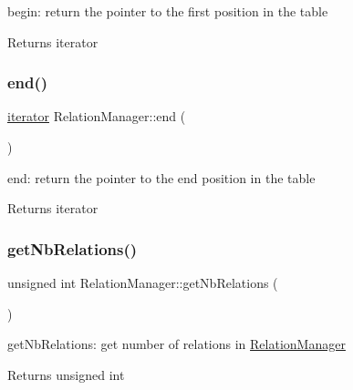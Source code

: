 begin\+: return the pointer to the first position in the table 

\begin{DoxyReturn}{Returns}
iterator 
\end{DoxyReturn}
\mbox{\label{class_relation_manager_a9425308e362ee6921041d1e904785f19}} 
\subsubsection{\texorpdfstring{end()}{end()}}
{\footnotesize\ttfamily \hyperlink{class_relation_manager_1_1iterator}{iterator} Relation\+Manager\+::end (\begin{DoxyParamCaption}{ }\end{DoxyParamCaption})\hspace{0.3cm}{\ttfamily [inline]}}



end\+: return the pointer to the end position in the table 

\begin{DoxyReturn}{Returns}
iterator 
\end{DoxyReturn}
\mbox{\label{class_relation_manager_ac4f3ef3f86fd911fb6619de910a52411}} 
\subsubsection{\texorpdfstring{get\+Nb\+Relations()}{getNbRelations()}}
{\footnotesize\ttfamily unsigned int Relation\+Manager\+::get\+Nb\+Relations (\begin{DoxyParamCaption}{ }\end{DoxyParamCaption})\hspace{0.3cm}{\ttfamily [inline]}}



get\+Nb\+Relations\+: get number of relations in \hyperlink{class_relation_manager}{Relation\+Manager} 

\begin{DoxyReturn}{Returns}
unsigned int 
\end{DoxyReturn}
\mbox{\label{class_relation_manager_ab5eedc7d52a94e7377b532704366ee48}} 
